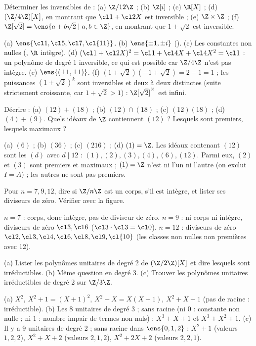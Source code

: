 \begin{exo}[S][Inversibles]
Déterminer les inversibles de : (a) $\Z/12\Z$ ; (b) $\Z[i]$ ; (c) $\R[X]$ ; (d) $(\Z/4\Z)[X]$, en montrant que $\cl1+\cl2X$ est inversible ; (e) $\Z\times\Z$ ; (f) $\Z[\sqrt2]=\ens{a+b\sqrt2\mid a,b\in\Z}$, en montrant que $1+\sqrt2$ est inversible.
\begin{corrige}
(a) $\ens{\cl1,\cl5,\cl7,\cl{11}}$. (b) $\ens{\pm1,\pm i}$ (). (c) Les constantes non nulles (, $\R$ intègre). (d) $(\cl1+\cl2X)^2=\cl1+\cl4X+\cl4X^2=\cl1$ : un polynôme de degré 1 inversible, ce qui est possible car $\Z/4\Z$ n'est pas intègre. (e) $\ens{(\pm1,\pm1)}$. (f) $(1+\sqrt2)(-1+\sqrt2)=2-1=1$ ; les puissances $(1+\sqrt2)^k$ sont inversibles et deux à deux distinctes (suite strictement croissante, car $1+\sqrt2>1$) : $\Z[\sqrt2]^\times$ est infini.
\end{corrige}
\end{exo}
\begin{exo}[S][Idéaux de $\Z$]
Décrire : (a) $(12)+(18)$ ; (b) $(12)\cap(18)$ ; (c) $(12)(18)$ ; (d) $(4)+(9)$. Quels idéaux de $\Z$ contiennent $(12)$ ? Lesquels sont premiers, lesquels maximaux ?
\begin{corrige}
(a) $(6)$ ; (b) $(36)$ ; (c) $(216)$ ; (d) $(1)=\Z$. Les idéaux contenant $(12)$ sont les $(d)$ avec $d\mid12$ : $(1),(2),(3),(4),(6),(12)$. Parmi eux, $(2)$ et $(3)$ sont premiers et maximaux ; $(1)=\Z$ n'est ni l'un ni l'autre (on exclut $I=A$) ; les autres ne sont pas premiers.
\end{corrige}
\end{exo}
\begin{exo}
Pour $n=7,9,12$, dire si $\Z/n\Z$ est un corps, s'il est intègre, et lister ses diviseurs de zéro. Vérifier avec la figure.
\begin{corrige}
$n=7$ : corps, donc intègre, pas de diviseur de zéro. $n=9$ : ni corps ni intègre, diviseurs de zéro $\cl3,\cl6$ ($\cl3\cdot\cl3=\cl0$). $n=12$ : diviseurs de zéro $\cl2,\cl3,\cl4,\cl6,\cl8,\cl9,\cl{10}$ (les classes non nulles non premières avec 12).
\end{corrige}
\end{exo}
\begin{exo}
(a) Lister les polynômes unitaires de degré 2 de $(\Z/2\Z)[X]$ et dire lesquels sont irréductibles. (b) Même question en degré 3. (c) Trouver les polynômes unitaires irréductibles de degré 2 sur $\Z/3\Z$.
\begin{corrige}
(a) $X^2$, $X^2+1=(X+1)^2$, $X^2+X=X(X+1)$, $X^2+X+1$ (pas de racine : irréductible). (b) Les 8 unitaires de degré 3 ; sans racine (ni $0$ : constante non nulle ; ni $1$ : nombre impair de termes non nuls) : $X^3+X+1$ et $X^3+X^2+1$. (c) Il y a 9 unitaires de degré 2 ; sans racine dans $\ens{0,1,2}$ : $X^2+1$ (valeurs $1,2,2$), $X^2+X+2$ (valeurs $2,1,2$), $X^2+2X+2$ (valeurs $2,2,1$).
\end{corrige}
\end{exo}

